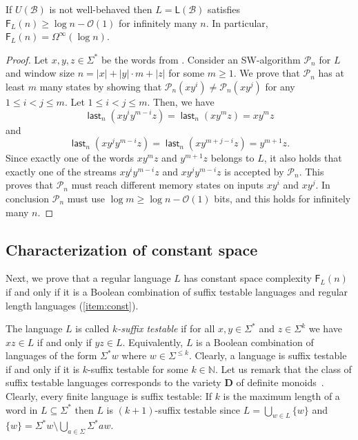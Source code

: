 \documentclass{theoretics}
\newcommand{\N}{\mathbb{N}}
\newcommand{\B}{\mathcal{B}}
\renewcommand{\O}{\mathcal{O}}
\renewcommand{\P}{\mathcal{P}}
\newcommand{\F}{\mathsf{F}}
\renewcommand{\L}{\mathsf{L}}
\DeclareMathOperator{\last}{\mathsf{last}}
\renewcommand{\geq}{\geqslant}
\renewcommand{\leq}{\leqslant}
\renewcommand{\ge}{\geq}
\renewcommand{\le}{\leq}
\newcommand{\Omegainf}{\Omega^{\scriptscriptstyle{\infty}}}
\begin{document}
\begin{proposition}
	\label{prop:logn-lb}
	If $U(\B)$ is not well-behaved then $L = \L(\B)$
	satisfies $\F_L(n) \geq \log n - \O(1)$ for infinitely many $n$.
	In particular, $\F_L(n) = \Omegainf(\log n)$.
\end{proposition}

\begin{proof}
	Let $x,y,z \in \Sigma^*$ be the words from .
	Consider an SW-algorithm $\P_n$ for $L$ and window size $n = |x| + |y| \cdot m + |z|$ for some $m \ge 1$.
	We prove that $\P_n$ has at least $m$ many states
	by showing that $\P_n(x y^i) \neq \P_n(x y^j)$ for any $1 \le i < j \le m$.
	Let $1 \le i < j \le m$.
	Then, we have
	\[
		\last_n(x y^i y^{m-i} z) = \last_n(x y^m z) = x y^m z
	\]
	and
	\[
		\last_n(x y^j y^{m-i} z) = \last_n(x y^{m+j-i} z) = y^{m+1} z.
	\]
	Since exactly one of the words $x y^m z$ and $y^{m+1} z$ belongs to $L$,
	it also holds that exactly one of the streams $x y^i y^{m-i} z$ and $x y^j y^{m-i} z$
	is accepted by $\P_n$.
	This proves that $\P_n$ must reach different memory states on inputs $x y^i$ and $x y^j$.
	In conclusion $\P_n$ must use $\log m \ge \log n - \O(1)$ bits, and this holds for infinitely many $n$.
\end{proof}


\subsection{Characterization of constant space}

\label{sec:char-const}

Next, we prove that a regular language $L$ has constant space complexity $\F_L(n)$
if and only if it is a Boolean combination of suffix testable languages
and regular length languages (\ref{item:const}).

The language $L$ is called {\em $k$-suffix testable}
if for all $x,y \in \Sigma^*$ and $z \in \Sigma^k$ we have
$xz \in L$ if and only if $yz \in L$.
Equivalently, $L$ is a Boolean combination of languages of the form $\Sigma^* w$ where $w \in \Sigma^{\le k}$.
Clearly, a language is suffix testable if and only if
it is $k$-suffix testable for some $k \in \N$.
Let us remark that the class of suffix testable languages corresponds to the variety
$\mathbf{D}$ of definite monoids~\cite{Straubing85}.
Clearly, every finite language
is suffix testable: If $k$ is the maximum length of a word in $L \subseteq \Sigma^*$ then $L$ is $(k+1)$-suffix testable
since $L = \bigcup_{w \in L} \{w\}$ and $\{w\} = \Sigma^* w \setminus \bigcup_{a \in \Sigma} \Sigma^*aw$. 
\end{document}
